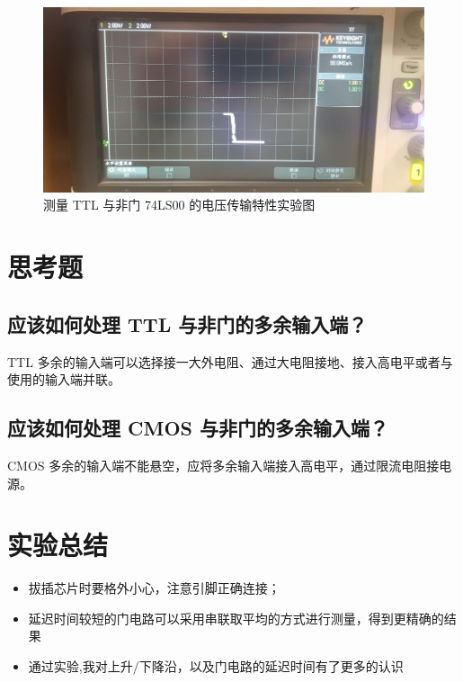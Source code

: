 \documentclass[a4paper]{article}
\begin{document}
        \begin{figure}[H]
            \centering
            \includegraphics[width=0.7\linewidth]{figures/f7}
            \caption{测量 TTL 与非门 74LS00 的电压传输特性实验图}
        \end{figure}

\section{思考题}

    \subsection{应该如何处理 TTL 与非门的多余输入端？}
        
        \par TTL 多余的输入端可以选择接一大外电阻、通过大电阻接地、接入高电平或者与使用的输入端并联。
    
    \subsection{应该如何处理 CMOS 与非门的多余输入端？}
        \par CMOS 多余的输入端不能悬空，应将多余输入端接入高电平，通过限流电阻接电源。

\section{实验总结}

    \begin{itemize}
        \item 拔插芯片时要格外小心，注意引脚正确连接；
        \item 延迟时间较短的门电路可以采用串联取平均的方式进行测量，得到更精确的结果
        \item 通过实验,我对上升/下降沿，以及门电路的延迟时间有了更多的认识
    \end{itemize}
\end{document}
